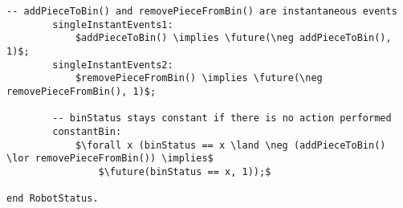 \begin{lstlisting}[fontadjust, mathescape, frame=single]
        -- addPieceToBin() and removePieceFromBin() are instantaneous events
        singleInstantEvents1:
            $addPieceToBin() \implies \future(\neg addPieceToBin(), 1)$;
        singleInstantEvents2:
            $removePieceFromBin() \implies \future(\neg removePieceFromBin(), 1)$;

        -- binStatus stays constant if there is no action performed
        constantBin: 
            $\forall x (binStatus == x \land \neg (addPieceToBin() \lor removePieceFromBin()) \implies$
                $\future(binStatus == x, 1));$

end RobotStatus.
\end{lstlisting}